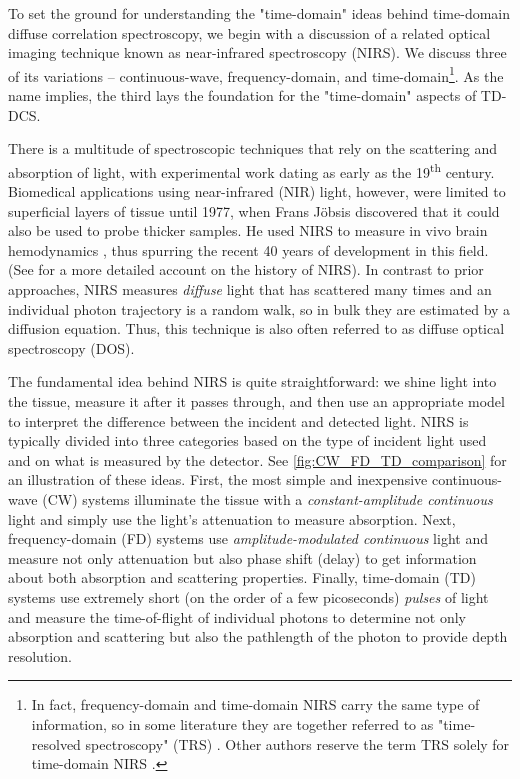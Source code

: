 To set the ground for understanding the "time-domain" ideas behind time-domain diffuse correlation spectroscopy, we begin with a discussion of a related optical imaging technique known as near-infrared spectroscopy (NIRS). We discuss three of its variations -- continuous-wave, frequency-domain, and time-domain\footnote{In fact, frequency-domain and time-domain NIRS carry the same type of information, so in some literature they are together referred to as "time-resolved spectroscopy" (TRS) \cite{Scholkmann2013}. Other authors reserve the term TRS solely for time-domain NIRS \cite{Wolf2007}.}. As the name implies, the third lays the foundation for the "time-domain" aspects of TD-DCS.  


There is a multitude of spectroscopic techniques that rely on the scattering and absorption of light, with experimental work dating as early as the 19\textsuperscript{th} century. Biomedical applications using near-infrared (NIR) light, however, were limited to superficial layers of tissue until 1977, when Frans J{\"o}bsis discovered that it could also be used to probe thicker samples. He used NIRS to measure in vivo brain hemodynamics \cite{Jobsis1977}, thus spurring the recent 40 years of development in this field. (See \cite{Ferrari2012} for a more detailed account on the history of NIRS). In contrast to prior approaches, NIRS measures \emph{diffuse} light that has scattered many times and an individual photon trajectory is a random walk, so in bulk they are estimated by a diffusion equation. Thus, this technique is also often referred to as diffuse optical spectroscopy (DOS). 

The fundamental idea behind NIRS is quite straightforward: we shine light into the tissue, measure it after it passes through, and then use an appropriate model to interpret the difference between the incident and detected light. NIRS is typically divided into three categories based on the type of incident light used and on what is measured by the detector. See \autoref{fig:CW_FD_TD_comparison} for an illustration of these ideas. First, the most simple and inexpensive continuous-wave (CW) systems illuminate the tissue with a \emph{constant-amplitude continuous} light and simply use the light’s attenuation to measure absorption. Next, frequency-domain (FD) systems use \emph{amplitude-modulated continuous} light and measure not only attenuation but also phase shift (delay) to get information about both absorption and scattering properties. Finally, time-domain (TD) systems use extremely short (on the order of a few picoseconds) \emph{pulses} of light and measure the time-of-flight of individual photons to determine not only absorption and scattering but also the pathlength of the photon to provide depth resolution. 

